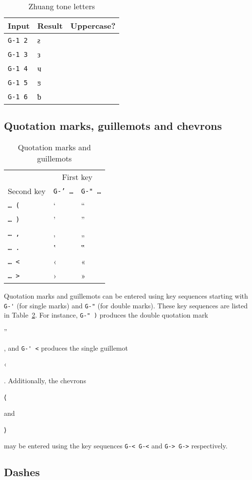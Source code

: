 \documentclass[oneside]{memoir}
\newcommand{\cmark}{\ding{51}}
\newcommand{\key}{\verb}
\newcommand{\keynv}{\texttt}
\newcommand{\out}[1]{\colorbox{gray!20}{\strut{}#1}}
\begin{document}
{{{\begin{table}[t]
\centering
\caption{Zhuang tone letters}
\label{tab:zhuang_tones}
\centering
\begin{tabular}{lll}
\toprule
Input & Result & Uppercase? \\
\midrule
\key|G-1 2| & ƨ & \cmark \\
\key|G-1 3| & з & \cmark \\
\key|G-1 4| & ч & \cmark \\
\key|G-1 5| & ƽ & \cmark \\
\key|G-1 6| & ƅ & \cmark \\
\bottomrule
\end{tabular}
\end{table}

\subsection{Quotation marks, guillemots and chevrons}
\label{sec:quotation_marks_guillemots_chevrons}

\begin{table}[b]
\caption{Quotation marks and guillemots}
\label{tab:quotes_guillemots}
\centering
\begin{tabular}{lll}
\toprule
& \multicolumn{2}{c}{First key} \\
\cmidrule(l){2-3}
Second key & \keynv{G-' …} & \keynv{G-" …} \\
\midrule
\keynv{… (} & ‘ & “ \\
\keynv{… )} & ’ & ” \\
\keynv{… ,} & ‚ & „ \\
\keynv{… .} & ‛ & ‟ \\
\keynv{… <} & ‹ & « \\
\keynv{… >} & › & » \\
\bottomrule
\end{tabular}
\end{table}

Quotation marks and guillemots can be entered using key sequences starting with
  \key|G-'| (for single marks) and \key|G-"| (for double marks).
These key sequences are listed in Table~\ref{tab:quotes_guillemots}.
For instance, \key|G-" )| produces the double quotation mark~\out{”}, and \key|G-' <| produces the single guillemot~\out{‹}.
Additionally, the chevrons \out{⟨} and \out{⟩} may be entered using the key sequences \key|G-< G-<| and \key|G-> G->| respectively.

\subsection{Dashes}
\label{sec:dashes}

}}}
\end{document}
